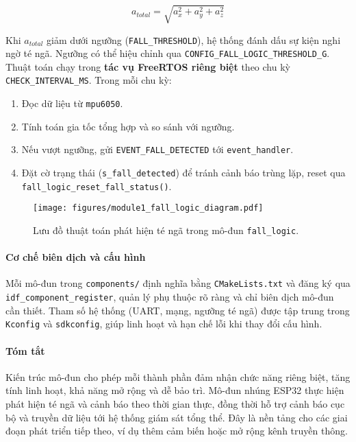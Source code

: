 \[
a_{total} = \sqrt{a_x^2 + a_y^2 + a_z^2}
\]

Khi $a_{total}$ giảm dưới ngưỡng (\texttt{FALL\_THRESHOLD}), hệ thống đánh dấu sự kiện nghi ngờ té ngã. Ngưỡng có thể hiệu chỉnh qua \texttt{CONFIG\_FALL\_LOGIC\_THRESHOLD\_G}. Thuật toán chạy trong \textbf{tác vụ FreeRTOS riêng biệt} theo chu kỳ \texttt{CHECK\_INTERVAL\_MS}. Trong mỗi chu kỳ:

\begin{enumerate}
    \item Đọc dữ liệu từ \texttt{mpu6050}.  
    \item Tính toán gia tốc tổng hợp và so sánh với ngưỡng.  
    \item Nếu vượt ngưỡng, gửi \texttt{EVENT\_FALL\_DETECTED} tới \texttt{event\_handler}.  
    \item Đặt cờ trạng thái (\texttt{s\_fall\_detected}) để tránh cảnh báo trùng lặp, reset qua \texttt{fall\_logic\_reset\_fall\_status()}.
\end{enumerate}

\begin{figure}[h!]
    \centering
    \texttt{[image: figures/module1\_fall\_logic\_diagram.pdf]}
    \caption{Lưu đồ thuật toán phát hiện té ngã trong mô-đun \texttt{fall\_logic}.}
    \label{fig:fall_logic_flow}
\end{figure}

\paragraph{Cơ chế biên dịch và cấu hình}  
Mỗi mô-đun trong \texttt{components/} định nghĩa bằng \texttt{CMakeLists.txt} và đăng ký qua \texttt{idf\_component\_register}, quản lý phụ thuộc rõ ràng và chỉ biên dịch mô-đun cần thiết. Tham số hệ thống (UART, mạng, ngưỡng té ngã) được tập trung trong \texttt{Kconfig} và \texttt{sdkconfig}, giúp linh hoạt và hạn chế lỗi khi thay đổi cấu hình.

\paragraph{Tóm tắt}  
Kiến trúc mô-đun cho phép mỗi thành phần đảm nhận chức năng riêng biệt, tăng tính linh hoạt, khả năng mở rộng và dễ bảo trì. Mô-đun nhúng ESP32 thực hiện phát hiện té ngã và cảnh báo theo thời gian thực, đồng thời hỗ trợ cảnh báo cục bộ và truyền dữ liệu tới hệ thống giám sát tổng thể. Đây là nền tảng cho các giai đoạn phát triển tiếp theo, ví dụ thêm cảm biến hoặc mở rộng kênh truyền thông.
